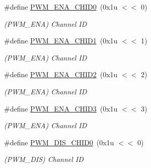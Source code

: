 \begin{DoxyCompactItemize}
\#define \mbox{\hyperlink{group__SAMV71__PWM_ga77c0afa3572c801d2b6cd0290b28aa4b}{P\+W\+M\+\_\+\+E\+N\+A\+\_\+\+C\+H\+I\+D0}}~(0x1u $<$$<$ 0)
\begin{DoxyCompactList}\small\item\em (P\+W\+M\+\_\+\+E\+NA) Channel ID \end{DoxyCompactList}\item 
\mbox{\label{group__SAMV71__PWM_ga0a4948f507b7d676ab5b011710d94d5a}} 
\#define \mbox{\hyperlink{group__SAMV71__PWM_ga0a4948f507b7d676ab5b011710d94d5a}{P\+W\+M\+\_\+\+E\+N\+A\+\_\+\+C\+H\+I\+D1}}~(0x1u $<$$<$ 1)
\begin{DoxyCompactList}\small\item\em (P\+W\+M\+\_\+\+E\+NA) Channel ID \end{DoxyCompactList}\item 
\mbox{\label{group__SAMV71__PWM_ga8de33fe21d0568c5af66072ea224b374}} 
\#define \mbox{\hyperlink{group__SAMV71__PWM_ga8de33fe21d0568c5af66072ea224b374}{P\+W\+M\+\_\+\+E\+N\+A\+\_\+\+C\+H\+I\+D2}}~(0x1u $<$$<$ 2)
\begin{DoxyCompactList}\small\item\em (P\+W\+M\+\_\+\+E\+NA) Channel ID \end{DoxyCompactList}\item 
\mbox{\label{group__SAMV71__PWM_gaa51ecf03f17443c907a60d29f7e63ffb}} 
\#define \mbox{\hyperlink{group__SAMV71__PWM_gaa51ecf03f17443c907a60d29f7e63ffb}{P\+W\+M\+\_\+\+E\+N\+A\+\_\+\+C\+H\+I\+D3}}~(0x1u $<$$<$ 3)
\begin{DoxyCompactList}\small\item\em (P\+W\+M\+\_\+\+E\+NA) Channel ID \end{DoxyCompactList}\item 
\mbox{\label{group__SAMV71__PWM_ga4091417cf1ab606fbb4763bb93ba4740}} 
\#define \mbox{\hyperlink{group__SAMV71__PWM_ga4091417cf1ab606fbb4763bb93ba4740}{P\+W\+M\+\_\+\+D\+I\+S\+\_\+\+C\+H\+I\+D0}}~(0x1u $<$$<$ 0)
\begin{DoxyCompactList}\small\item\em (P\+W\+M\+\_\+\+D\+IS) Channel ID \end{DoxyCompactList}\item 
\mbox{\label{group__SAMV71__PWM_ga018c7471f812f9bbbfb758e7d1d95a35}} 
$$
\end{DoxyCompactItemize}
